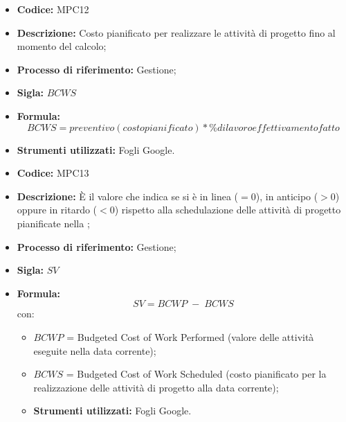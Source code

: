 \begin{itemize}
	\item \textbf{Codice:} MPC12
	\item \textbf{Descrizione:} Costo pianificato per realizzare le attività di progetto fino al momento del calcolo;
	\item \textbf{Processo di riferimento:} Gestione;
	\item \textbf{Sigla:} $BCWS$
	\item \textbf{Formula:} $$BCWS = {preventivo(costo pianificato) * \% di lavoro effettivamento fatto}$$
	\item \textbf{Strumenti utilizzati:} Fogli Google.
\end{itemize}

    \begin{itemize}
        \item \textbf{Codice:} MPC13
        \item \textbf{Descrizione:} È il valore che indica se si è in linea ($=0$), in anticipo ($>0$) oppure in ritardo ($<0$) rispetto alla schedulazione delle attività di progetto pianificate nella ;
        \item \textbf{Processo di riferimento:} Gestione;
        \item \textbf{Sigla:} $SV$
        \item \textbf{Formula:} $$SV = {BCWP \; - \; BCWS}$$
        con:
        \begin{itemize}
            \item $BCWP$ = Budgeted Cost of Work Performed (valore delle attività eseguite nella data corrente);
            \item $BCWS$ = Budgeted Cost of Work Scheduled (costo pianificato per la realizzazione delle attività di progetto alla data corrente);
            \item \textbf{Strumenti utilizzati:} Fogli Google.
        \end{itemize}
    \end{itemize}

